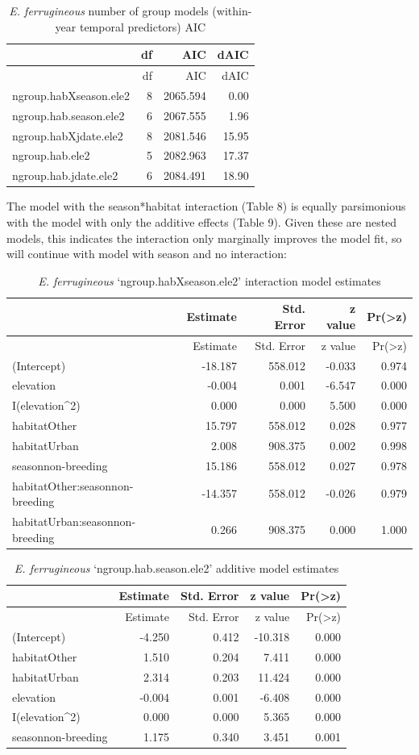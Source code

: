 \documentclass[]{article}
\begin{document}
\begin{longtable}[]{@{}lrrr@{}}
\caption{\textit{E. ferrugineous} number of group models (within-year
temporal predictors) AIC}\tabularnewline
\toprule
& df & AIC & dAIC\tabularnewline
\midrule
\endfirsthead
\toprule
& df & AIC & dAIC\tabularnewline
\midrule
\endhead
ngroup.habXseason.ele2 & 8 & 2065.594 & 0.00\tabularnewline
ngroup.hab.season.ele2 & 6 & 2067.555 & 1.96\tabularnewline
ngroup.habXjdate.ele2 & 8 & 2081.546 & 15.95\tabularnewline
ngroup.hab.ele2 & 5 & 2082.963 & 17.37\tabularnewline
ngroup.hab.jdate.ele2 & 6 & 2084.491 & 18.90\tabularnewline
\bottomrule
\end{longtable}

The model with the season*habitat interaction (Table 8) is equally
parsimonious with the model with only the additive effects (Table 9).
Given these are nested models, this indicates the interaction only
marginally improves the model fit, so will continue with model with
season and no interaction:

\begin{longtable}[]{@{}lrrrr@{}}
\caption{\textit{E. ferrugineous} `ngroup.habXseason.ele2' interaction
model estimates}\tabularnewline
\toprule
& Estimate & Std. Error & z value &
Pr(\textgreater{}\textbar{}z\textbar{})\tabularnewline
\midrule
\endfirsthead
\toprule
& Estimate & Std. Error & z value &
Pr(\textgreater{}\textbar{}z\textbar{})\tabularnewline
\midrule
\endhead
(Intercept) & -18.187 & 558.012 & -0.033 & 0.974\tabularnewline
elevation & -0.004 & 0.001 & -6.547 & 0.000\tabularnewline
I(elevation\^{}2) & 0.000 & 0.000 & 5.500 & 0.000\tabularnewline
habitatOther & 15.797 & 558.012 & 0.028 & 0.977\tabularnewline
habitatUrban & 2.008 & 908.375 & 0.002 & 0.998\tabularnewline
seasonnon-breeding & 15.186 & 558.012 & 0.027 & 0.978\tabularnewline
habitatOther:seasonnon-breeding & -14.357 & 558.012 & -0.026 &
0.979\tabularnewline
habitatUrban:seasonnon-breeding & 0.266 & 908.375 & 0.000 &
1.000\tabularnewline
\bottomrule
\end{longtable}

\begin{longtable}[]{@{}lrrrr@{}}
\caption{\textit{E. ferrugineous} `ngroup.hab.season.ele2' additive
model estimates}\tabularnewline
\toprule
& Estimate & Std. Error & z value &
Pr(\textgreater{}\textbar{}z\textbar{})\tabularnewline
\midrule
\endfirsthead
\toprule
& Estimate & Std. Error & z value &
Pr(\textgreater{}\textbar{}z\textbar{})\tabularnewline
\midrule
\endhead
(Intercept) & -4.250 & 0.412 & -10.318 & 0.000\tabularnewline
habitatOther & 1.510 & 0.204 & 7.411 & 0.000\tabularnewline
habitatUrban & 2.314 & 0.203 & 11.424 & 0.000\tabularnewline
elevation & -0.004 & 0.001 & -6.408 & 0.000\tabularnewline
I(elevation\^{}2) & 0.000 & 0.000 & 5.365 & 0.000\tabularnewline
seasonnon-breeding & 1.175 & 0.340 & 3.451 & 0.001\tabularnewline
\bottomrule
\end{longtable}
\end{document}
